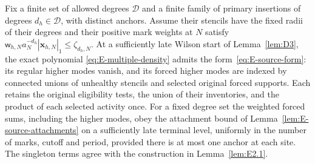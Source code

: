 \begin{lemma}\label{lem:E-joint-terminal}
Fix a finite set of allowed degrees $\mathcal D$ and a finite family of
primary insertions of degrees $d_h\in\mathcal D$, with distinct anchors.
Assume their stencils have the fixed radii of their degrees and their
positive mark weights at $N$ satisfy
$\mathsf w_{h,N}a_N^{-d_h}|\mathbf x_{h,N}|_1\le\zeta_{d_h,N}$.
At a sufficiently late Wilson start of Lemma~\ref{lem:D3}, the exact polynomial
\eqref{eq:E-multiple-density} admits the form~\eqref{eq:E-source-form}:
its regular higher modes vanish, and its forced higher modes are
indexed by connected unions of unhealthy stencils and selected original
forced supports. Each retains the original eligibility tests, the union
of their inventories, and the product of each selected activity once.
For a fixed degree set the weighted forced sums, including the higher
modes, obey the attachment bound of
Lemma~\ref{lem:E-source-attachments} on a sufficiently late terminal
level, uniformly in the number of marks, cutoff and period, provided
there is at most one anchor at each site. The singleton terms agree with
the construction in Lemma~\ref{lem:E2.1}.
\end{lemma}
